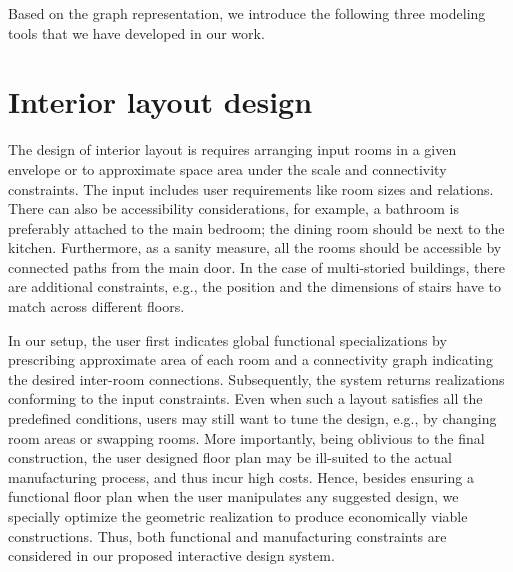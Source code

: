 
Based on the graph representation, we introduce the following three modeling tools that we have developed in our work.

\section{Interior layout design}

The design of interior layout is requires arranging input rooms in a given envelope or to approximate space area under the scale and connectivity constraints. The input includes user requirements like room sizes and relations. There can also be accessibility considerations, for example, a bathroom is preferably attached to the main bedroom; the dining room should be next to the kitchen. Furthermore, as a sanity measure, all the rooms should be accessible by connected paths from the main door. In the case of multi-storied buildings, there are additional constraints, e.g., the position and the dimensions of stairs have to match across different floors.

In our setup, the user first indicates global functional specializations by prescribing approximate area of each room and a connectivity graph indicating the desired inter-room connections. Subsequently, the system returns realizations conforming to the input constraints. Even when such a layout satisfies all the predefined conditions, users may still want to tune the design, e.g., by changing room areas or swapping rooms. More importantly, being oblivious to the final construction, the user designed floor plan may be ill-suited to the actual manufacturing process, and thus incur high costs. Hence, besides ensuring a functional floor plan when the user manipulates any suggested design, we specially optimize the geometric realization to produce economically viable constructions. Thus, both functional and manufacturing constraints are considered in our proposed interactive design system.


